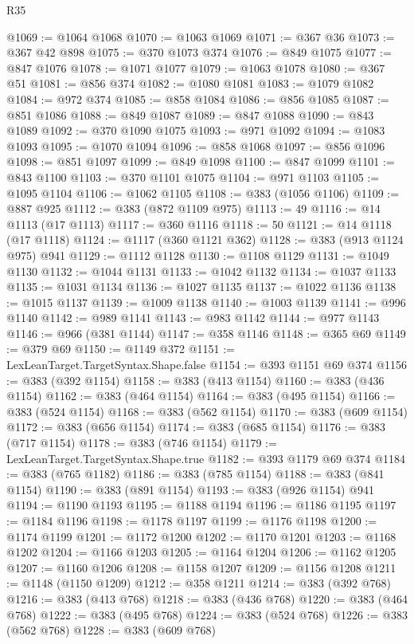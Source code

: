 \begin{lexlean}{R35}
\begin{coremodule}
{{{{{{{{{{{{{{{{{{{{{{{{{{{{{{{{{{{{{{{{{{{{{{{{{{{{@1069 := @1064 @1068
@1070 := @1063 @1069
@1071 := @367 @36
@1073 := @367 @42 @898
@1075 := @370 @1073 @374
@1076 := @849 @1075
@1077 := @847 @1076
@1078 := @1071 @1077
@1079 := @1063 @1078
@1080 := @367 @51
@1081 := @856 @374
@1082 := @1080 @1081
@1083 := @1079 @1082
@1084 := @972 @374
@1085 := @858 @1084
@1086 := @856 @1085
@1087 := @851 @1086
@1088 := @849 @1087
@1089 := @847 @1088
@1090 := @843 @1089
@1092 := @370 @1090 @1075
@1093 := @971 @1092
@1094 := @1083 @1093
@1095 := @1070 @1094
@1096 := @858 @1068
@1097 := @856 @1096
@1098 := @851 @1097
@1099 := @849 @1098
@1100 := @847 @1099
@1101 := @843 @1100
@1103 := @370 @1101 @1075
@1104 := @971 @1103
@1105 := @1095 @1104
@1106 := @1062 @1105
@1108 := @383 (@1056 @1106)
@1109 := @887 @925
@1112 := @383 (@872 @1109 @975)
@1113 := 49
@1116 := @14 @1113 (@17 @1113)
@1117 := @360 @1116
@1118 := 50
@1121 := @14 @1118 (@17 @1118)
@1124 := @1117 (@360 @1121 @362)
@1128 := @383 (@913 @1124 @975) @941
@1129 := @1112 @1128
@1130 := @1108 @1129
@1131 := @1049 @1130
@1132 := @1044 @1131
@1133 := @1042 @1132
@1134 := @1037 @1133
@1135 := @1031 @1134
@1136 := @1027 @1135
@1137 := @1022 @1136
@1138 := @1015 @1137
@1139 := @1009 @1138
@1140 := @1003 @1139
@1141 := @996 @1140
@1142 := @989 @1141
@1143 := @983 @1142
@1144 := @977 @1143
@1146 := @966 (@381 @1144)
@1147 := @358 @1146
@1148 := @365 @69
@1149 := @379 @69
@1150 := @1149 @372
@1151 := LexLeanTarget.TargetSyntax.Shape.false
@1154 := @393 @1151 @69 @374
@1156 := @383 (@392 @1154)
@1158 := @383 (@413 @1154)
@1160 := @383 (@436 @1154)
@1162 := @383 (@464 @1154)
@1164 := @383 (@495 @1154)
@1166 := @383 (@524 @1154)
@1168 := @383 (@562 @1154)
@1170 := @383 (@609 @1154)
@1172 := @383 (@656 @1154)
@1174 := @383 (@685 @1154)
@1176 := @383 (@717 @1154)
@1178 := @383 (@746 @1154)
@1179 := LexLeanTarget.TargetSyntax.Shape.true
@1182 := @393 @1179 @69 @374
@1184 := @383 (@765 @1182)
@1186 := @383 (@785 @1154)
@1188 := @383 (@841 @1154)
@1190 := @383 (@891 @1154)
@1193 := @383 (@926 @1154) @941
@1194 := @1190 @1193
@1195 := @1188 @1194
@1196 := @1186 @1195
@1197 := @1184 @1196
@1198 := @1178 @1197
@1199 := @1176 @1198
@1200 := @1174 @1199
@1201 := @1172 @1200
@1202 := @1170 @1201
@1203 := @1168 @1202
@1204 := @1166 @1203
@1205 := @1164 @1204
@1206 := @1162 @1205
@1207 := @1160 @1206
@1208 := @1158 @1207
@1209 := @1156 @1208
@1211 := @1148 (@1150 @1209)
@1212 := @358 @1211
@1214 := @383 (@392 @768)
@1216 := @383 (@413 @768)
@1218 := @383 (@436 @768)
@1220 := @383 (@464 @768)
@1222 := @383 (@495 @768)
@1224 := @383 (@524 @768)
@1226 := @383 (@562 @768)
@1228 := @383 (@609 @768)
}}}}}}}}}}}}}}}}}}}}}}}}}}}}}}}}}}}}}}}}}}}}}}}}}}}}
\end{coremodule}
\end{lexlean}
